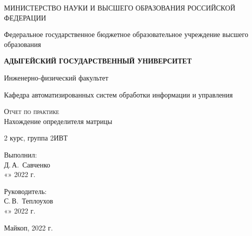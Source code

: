 \documentclass[14pt,a4paper]{scrartcl}
\begin{document}
 
\begin{titlepage} 
    \begin{center}
        \large
        МИНИСТЕРСТВО НАУКИ И ВЫСШЕГО ОБРАЗОВАНИЯ РОССИЙСКОЙ ФЕДЕРАЦИИ
        
        Федеральное государственное бюджетное образовательное учреждение высшего образования
        
        \textbf{АДЫГЕЙСКИЙ ГОСУДАРСТВЕННЫЙ УНИВЕРСИТЕТ}
        \vspace{0.25cm}
        
        Инженерно-физический факультет
        
        Кафедра автоматизированных систем обработки информации и управления
        \vfill

        \vfill
        
        \textsc{Отчет по практике}\\[5mm]
        
        {\LARGE Нахождение определителя матрицы }
        \bigskip
        
        2 курс, группа 2ИВТ
    \end{center}
    \vfill
    
    \newlength{\ML}
    \hfill\begin{minipage}{0.5\textwidth}
        Выполнил:\\
        \underline{\hspace{\ML}} Д.\,А.~Савченко\\
        «\underline{\hspace{0.7cm}}» \underline{\hspace{2cm}} 2022 г.
    \end{minipage}%
    \bigskip
    
    \hfill\begin{minipage}{0.5\textwidth}
        Руководитель:\\
        \underline{\hspace{\ML}} С.\,В.~Теплоухов\\
        «\underline{\hspace{0.7cm}}» \underline{\hspace{2cm}} 2022 г.
    \end{minipage}%
    \vfill
    
    \begin{center}
        Майкоп, 2022 г.
    \end{center}
\end{titlepage}
\tableofcontents
\newpage
\end{document}
